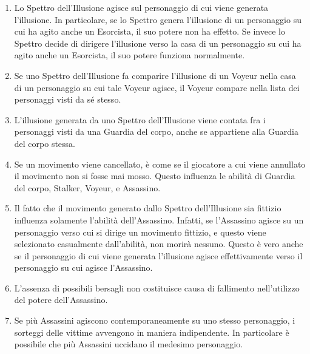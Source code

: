 \documentclass[a4paper,10pt]{article}
\begin{document}
\begin{enumerate}
	\item Lo Spettro dell'Illusione agisce sul personaggio di cui viene generata l'illusione. In particolare, se lo Spettro genera l'illusione di un personaggio su cui ha agito anche un Esorcista, il suo potere non ha effetto. Se invece lo Spettro decide di dirigere l'illusione verso la casa di un personaggio su cui ha agito anche un Esorcista, il suo potere funziona normalmente.
	
	\item Se uno Spettro dell'Illusione fa comparire l'illusione di un Voyeur nella casa di un personaggio su cui tale Voyeur agisce, il Voyeur compare nella lista dei personaggi visti da sé stesso.
	
	\item L'illusione generata da uno Spettro dell'Illusione viene contata fra i personaggi visti da una Guardia del corpo, anche se appartiene alla Guardia del corpo stessa.

	\item Se un movimento viene cancellato, è come se il giocatore a cui viene annullato il movimento non si fosse mai mosso. Questo influenza le abilità di Guardia del corpo, Stalker, Voyeur, e Assassino.
	
	\item Il fatto che il movimento generato dallo Spettro dell'Illusione sia fittizio influenza solamente l'abilità dell'Assassino. Infatti, se l'Assassino agisce su un personaggio verso cui si dirige un movimento fittizio, e questo viene selezionato casualmente dall'abilità, non morirà nessuno. Questo è vero anche se il personaggio di cui viene generata l'illusione agisce effettivamente verso il personaggio su cui agisce l'Assassino.
	
	\item L'assenza di possibili bersagli non costituisce causa di fallimento nell'utilizzo del potere dell'Assassino.
	
	\item Se più Assassini agiscono contemporaneamente su uno stesso personaggio, i sorteggi delle vittime avvengono in maniera indipendente.
	In particolare è possibile che più Assassini uccidano il medesimo personaggio.
	

\end{enumerate}
\end{document}
